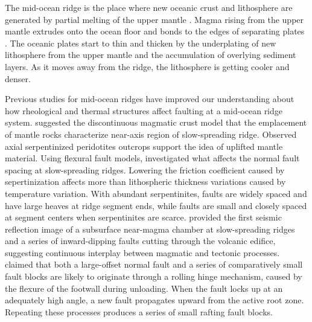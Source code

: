 \documentclass[letterpaper,12pt,notitle]{memphisthesis}                     %
\begin{document}
The mid-ocean ridge is the place where new oceanic crust and lithosphere are generated by partial melting of the upper mantle \citep{Cann1968}. Magma rising from the upper mantle extrudes onto the ocean floor and bonds to the edges of separating plates \citep{Chen1992}. The oceanic plates start to thin and thicken by the underplating of new lithosphere from the upper mantle and the accumulation of overlying sediment layers. As it moves away from the ridge, the lithosphere is getting cooler and denser.

Previous studies for mid-ocean ridges have improved our understanding about how rheological and thermal structures affect faulting at a mid-ocean ridge system.
\citet{Cannat1993} suggested the discontinuous magmatic crust model that the emplacement of mantle rocks characterize near-axis region of slow-spreading ridge. Observed axial serpentinized peridotites outcrops support the idea of uplifted mantle material. Using flexural fault models, \citet{Escartin1997} investigated what affects the normal fault spacing at slow-spreading ridges. Lowering the friction coefficient caused by sepertinization affects more than lithospheric thickness variations caused by temperature variation. With abundant serpentinites, faults are widely spaced and have large heaves at ridge segment ends, while faults are small and closely spaced at segment centers when serpentinites are scarce. \citet{Singh2006} provided the first seismic reflection image of a subsurface near-magma chamber at slow-spreading ridges and a series of inward-dipping faults cutting through the volcanic edifice, suggesting continuous interplay between magmatic and tectonic processes. \citet{Reston2011} claimed that both a large-offset normal fault and a series of comparatively small fault blocks are likely to originate through a rolling hinge mechanism, caused by the flexure of the footwall during unloading. When the fault locks up at an adequately high angle, a new fault propagates upward from the active root zone. Repeating these processes produces a series of small rafting fault blocks.
\end{document}
